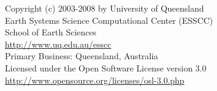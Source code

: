 
%
%
%


\begin{center}
Copyright (c) 2003-2008 by University of Queensland	\\
Earth Systems Science Computational Center (ESSCC)	\\
School of Earth Sciences \\
\url{http://www.uq.edu.au/esscc}			\\
Primary Business: Queensland, Australia			\\
Licensed under the Open Software License version 3.0	\\
\url{http://www.opensource.org/licenses/osl-3.0.php}	\\
\end{center}

